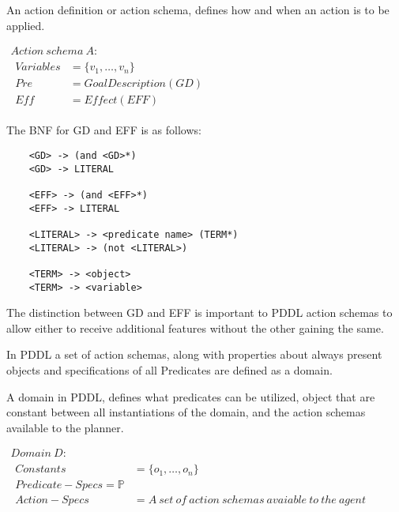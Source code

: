\documentclass[../Master.tex]{subfiles}
\begin{document}
	
\begin{definition} \label{def:lrn:action-spec-def}
		An action definition or action schema, defines how and when an action is to be applied. 
		
		$
		\begin{array}{ll}
		Action~schema~A: & \\
		
		\begin{array}{ll}
		Variables & = \{v_1,\dots,v_n\}			 \\  
		Pre	& = Goal Description(GD) \\
		Eff & = Effect(EFF) 
		\end{array}
		\end{array}$
		
		The BNF for GD and EFF is as follows:
		
		\begin{lstlisting}
	<GD> -> (and <GD>*) 
	<GD> -> LITERAL
	
	<EFF> -> (and <EFF>*)
	<EFF> -> LITERAL
	
	<LITERAL> -> <predicate name> (TERM*)
	<LITERAL> -> (not <LITERAL>)
	
	<TERM> -> <object>
	<TERM> -> <variable>
		\end{lstlisting}
		
		The distinction between GD and EFF is important to PDDL action schemas to allow either to receive additional features without the other gaining the same.
	\end{definition}
	
In PDDL a set of action schemas, along with properties about always present objects and specifications of all Predicates are defined as a domain.

\begin{definition} A domain in PDDL, defines what predicates can be utilized, object that are constant between all instantiations of the domain, and the action schemas available to the planner.
	
$
\begin{array}{ll}
Domain~D: & \\

\begin{array}{ll}
Constants & = \{o_1,\dots,o_n\}			 \\  
Predicate-Specs = \mathbb{P} \\
Action-Specs & = A~set~of~action~schemas~avaiable~to~the~agent \\
\end{array}
\end{array}$
\end{definition}
\end{document}
